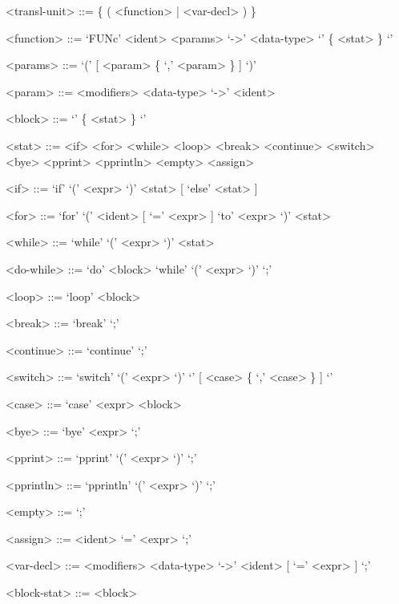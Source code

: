 \documentclass[12pt, a4paper]{article}
\begin{document}
    \setlength{\grammarparsep}{0.6em} %
    \setlength{\grammarindent}{10em} %

    \begin{grammar}

        <transl-unit> ::= \{ ( <function> | <var-decl> ) \}

        <function> ::= `FUNc' <ident> <params> `->' <data-type> `{'  \{ <stat> \} `}'

        <params> ::= `(' [ <param> \{ `,' <param> \} ] `)'

        <param> ::= <modifiers> <data-type> `->' <ident>

        <block> ::= `{'  \{ <stat> \} `}'

        <stat> ::= <if>
        \alt <for>
        \alt <while>
        \alt <loop>
        \alt <break>
        \alt <continue>
        \alt <switch>
        \alt <bye>
        \alt <pprint>
        \alt <pprintln>
        \alt <empty>
        \alt <assign>

        <if> ::= `if' `(' <expr> `)' <stat> [ `else' <stat> ]

        <for> ::= `for' `(' <ident> [ `=' <expr> ] `to' <expr> `)' <stat>

        <while> ::= `while' `(' <expr> `)' <stat>

        <do-while> ::= `do' <block> `while' `(' <expr> `)' `;'

        <loop> ::= `loop' <block>

        <break> ::= `break' `;'

        <continue> ::= `continue' `;'

        <switch> ::= `switch' `(' <expr> `)' `{' [ <case> \{ `,' <case> \} ] `}'

        <case> ::= `case' <expr> <block>

        <bye> ::= `bye' <expr> `;'

        <pprint> ::= `pprint' `(' <expr> `)' `;'

        <pprintln> ::= `pprintln' `(' <expr> `)' `;'

        <empty> ::= `;'

        <assign> ::= <ident> `=' <expr> `;'

        <var-decl> ::= <modifiers> <data-type> `->' <ident> [ `=' <expr> ] `;'

        <block-stat> ::= <block>


\end{grammar}
\end{document}
